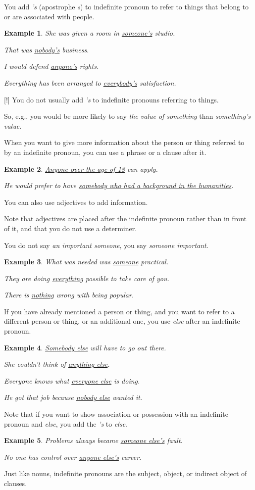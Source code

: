 \documentclass[oneside]{book}
\numberwithin{equation}{section}
\newtheorem{example}{Example}[section]
\begin{document}
%
\noindent{} You add \textit{'s} (apostrophe \textit{s}) to indefinite pronoun to refer to things that belong to or are associated with people.
\begin{example}
    She was given a room in \underline{someone's} studio.
    
    That was \underline{nobody's} business.
    
    I would defend \underline{anyone's} rights.
    
    Everything has been arranged to \underline{everybody's} satisfaction.
\end{example}
%
\noindent{} [!] You do not usually add \textit{'s} to indefinite pronouns referring to things.

So, e.g., you would be more likely to say \textit{the value of something} than \textit{something's value}.

%
\noindent{} When you want to give more information about the person or thing referred to by an indefinite pronoun, you can use a phrase or a clause after it.
\begin{example}
    \underline{Anyone over the age of 18} can apply.
    
    He would prefer to have \underline{somebody who had a background in the humanities}.
\end{example}
%
\noindent{} You can also use adjectives to add information.

Note that adjectives are placed after the indefinite pronoun rather than in front of it, and that you do not use a determiner.

You do not say \textit{an important someone}, you say \textit{someone important}.
\begin{example}
    What was needed was \underline{someone} practical.
    
    They are doing \underline{everything} possible to take care of you.
    
    There is \underline{nothing} wrong with being popular.
\end{example}
%
\noindent{} If you have already mentioned a person or thing, and you want to refer to a different person or thing, or an additional one, you use \textit{else} after an indefinite pronoun.
\begin{example}
    \underline{Somebody else} will have to go out there.
    
    She couldn't think of \underline{anything else}.
    
    Everyone knows what \underline{everyone else} is doing.
    
    He got that job because \underline{nobody else} wanted it.
\end{example}
Note that if you want to show association or possession with an indefinite pronoun and \textit{else}, you add the \textit{'s} to \textit{else}.
\begin{example}
    Problems always became \underline{someone else's} fault.
    
    No one has control over \underline{anyone else's} career.
\end{example}
%
\noindent{} Just like nouns, indefinite pronouns are the subject, object, or indirect object of clauses.
\end{document}
